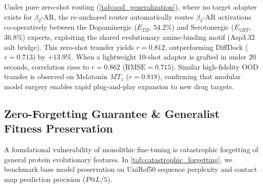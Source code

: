 \documentclass{article}
\theoremstyle{definition}
\begin{document}
Under pure zero-shot routing (\cref{tab:ood_generalization}), where no target adapter exists for $\beta_2$-AR, the re-anchored router automatically routes $\beta_2$-AR activations co-operatively between the Dopaminergic ($E_{D2}$, $54.2\%$) and Serotonergic ($E_{5HT}$, $36.8\%$) experts, exploiting the shared evolutionary amine-binding motif (Asp3.32 salt bridge). This zero-shot transfer yields $r = 0.812$, outperforming DiffDock ($r = 0.713$) by $+13.9\%$. When a lightweight 10-shot adapter is grafted in under $20$ seconds, correlation rises to $r = 0.862$ ($\text{RMSE} = 0.715$). Similar high-fidelity OOD transfer is observed on Melatonin $MT_1$ ($r = 0.818$), confirming that modular model surgery enables rapid plug-and-play expansion to new drug targets.

\subsection{Zero-Forgetting Guarantee \& Generalist Fitness Preservation}
A foundational vulnerability of monolithic fine-tuning is catastrophic forgetting of general protein evolutionary features. In \cref{tab:catastrophic_forgetting}, we benchmark base model preservation on UniRef50 sequence perplexity and contact map prediction precision ($P@L/5$).

\begin{table}[t]
\centering
\small
\caption{\textbf{Generalist Base Model Retention \& Zero-Forgetting Verification.} Evaluation of protein foundation model capabilities before and after domain adaptation. Metrics: masked language modeling perplexity on UniRef50 ($\text{PPL} \downarrow$), percentage perplexity drift ($\Delta \text{PPL} \downarrow$), and top-$L/5$ long-range contact map prediction precision ($P@L/5 \uparrow$). \emph{All four rows are simulation inputs; no ESM-2 forward pass or perplexity evaluation was run (\cref{sec:evidentiary_scope}).}}
\label{tab:catastrophic_forgetting}
\end{table}
\end{document}
